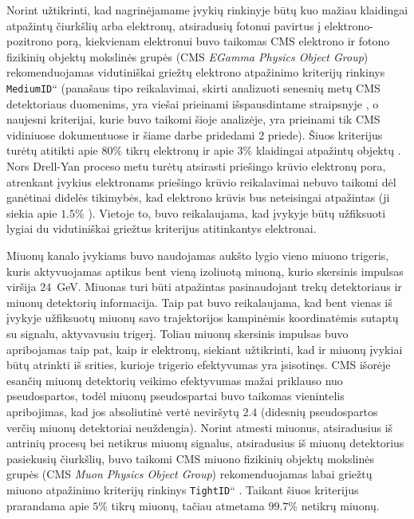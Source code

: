 \documentclass[a4paper, 12pt, oneside]{article}
\newcommand{\ttt}[1]{\texttt{#1}}
\newcommand{\ltq}[1]{{\quotedblbase{}#1\textquotedblleft{}}}
\newlength\q
\begin{document}
Norint užtikrinti, kad nagrinėjamame įvykių rinkinyje būtų kuo mažiau klaidingai atpažintų čiurkšlių arba elektronų,
atsiradusių fotonui pavirtus į elektrono-pozitrono porą, kiekvienam elektronui buvo taikomas CMS elektrono ir fotono
fizikinių objektų mokslinės grupės (CMS \textit{EGamma Physics Object Group}) rekomenduojamas vidutiniškai griežtų
elektrono atpažinimo kriterijų rinkinys \ltq{\ttt{MediumID}} (panašaus tipo reikalavimai, skirti analizuoti senesnių
metų CMS detektoriaus duomenims, yra viešai prieinami išspausdintame straipsnyje \cite{EleID}, o naujesni kriterijai,
kurie buvo taikomi šioje analizėje, yra prieinami tik CMS vidiniuose dokumentuose ir šiame darbe pridedami 2 priede).
Šiuos kriterijus turėtų atitikti apie $80\%$ tikrų elektronų ir apie $3\%$ klaidingai atpažintų objektų \cite{EleID}.
Nors Drell-Yan proceso metu turėtų atsirasti priešingo krūvio elektronų pora, atrenkant įvykius elektronams priešingo
krūvio reikalavimai nebuvo taikomi dėl ganėtinai didelės tikimybės, kad elektrono krūvis bus neteisingai atpažintas
(ji siekia apie $1.5\%$ \cite{EleID}).
Vietoje to, buvo reikalaujama, kad įvykyje būtų užfiksuoti lygiai du vidutiniškai griežtus kriterijus atitinkantys
elektronai.

Miuonų kanalo įvykiams buvo naudojamas aukšto lygio vieno miuono trigeris, kuris aktyvuojamas aptikus bent vieną izoliuotą
miuoną, kurio skersinis impulsas viršija $24$~GeV.
Miuonas turi būti atpažintas pasinaudojant trekų detektoriaus ir miuonų detektorių informacija.
Taip pat buvo reikalaujama, kad bent vienas iš įvykyje užfiksuotų miuonų savo trajektorijos kampinėmis koordinatėmis
sutaptų su signalu, aktyvavusiu trigerį.
Toliau miuonų skersinis impulsas buvo apribojamas taip pat, kaip ir elektronų, siekiant užtikrinti, kad ir miuonų įvykiai
būtų atrinkti iš srities, kurioje trigerio efektyvumas yra įsisotinęs.
CMS išorėje esančių miuonų detektorių veikimo efektyvumas mažai priklauso nuo pseudospartos, todėl miuonų pseudospartai
buvo taikomas vienintelis apribojimas, kad jos absoliutinė vertė neviršytų $2.4$ (didesnių pseudospartos verčių
miuonų detektoriai neuždengia).
Norint atmesti miuonus, atsiradusius iš antrinių procesų bei netikrus miuonų signalus, atsiradusius iš miuonų detektorius
pasiekusių čiurkšlių, buvo taikomi CMS miuono fizikinių objektų mokslinės grupės (CMS \textit{Muon Physics Object Group})
rekomenduojamas labai griežtų miuono atpažinimo kriterijų rinkinys \ltq{\ttt{TightID}} \cite{MuonID}.
Taikant šiuos kriterijus prarandama apie $5\%$ tikrų miuonų, tačiau atmetama $99.7\%$ netikrų miuonų.
\end{document}
